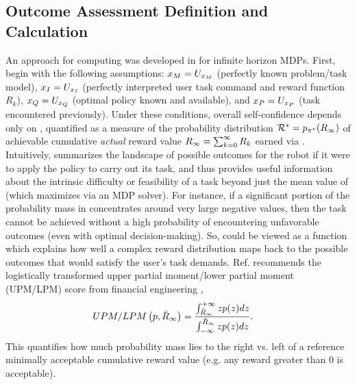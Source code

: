 \subsection{Outcome Assessment Definition and Calculation} \label{sec:xO}
An approach for computing \xO{} was developed in \cite{Aitken2016-cv} for infinite horizon MDPs. First, begin with the following assumptions: $x_M=U_{x_M}$ (perfectly known problem/task model), $x_I= U_{x_I}$ (perfectly interpreted user task command and reward function $R_k$), $x_Q=U_{x_Q}$ (optimal policy \piopt{} known and available), and $x_P=U_{x_P}$ (task encountered previously).  %
Under these conditions, overall self-confidence depends only on \xO{},  quantified as a measure of the probability distribution  $\mathcal{R}^* = p_{\pi^*}(R_{\infty})$ of achievable cumulative \emph{actual} reward value $R_{\infty}= \sum_{k=0}^{\infty}R_{k}$ earned via \piopt. %
Intuitively, \rwdopt{} summarizes the landscape of possible outcomes for the robot if it were to apply the policy \piopt{} to carry out its task, and thus provides useful information about the intrinsic difficulty or feasibility of a task beyond just the mean value of \ri{} (which \piopt{} maximizes via an MDP solver). For instance, if a significant portion of the probability mass in \rwdopt{} concentrates around very large negative values, then the task cannot be achieved without a high probability of encountering unfavorable outcomes (even with optimal decision-making). So, \xO{} could be viewed as a function which explains how well a complex reward distribution maps back to the possible outcomes that would satisfy the user's task demands. Ref. \cite{Aitken2016-cv} recommends the logistically transformed upper partial moment/lower partial moment (UPM/LPM) score from financial engineering \cite{wojt2009portfolio}, 
    \begin{align}
        \mbox{UPM/LPM} \left(p,\riref\right) &= \frac{\int_{\riref}^{+\infty}zp(z)dz}{\int_{-\infty}^{\riref} zp(z)dz}. \label{eq:upm_lpm}
    \end{align}
This quantifies how much probability mass lies to the right vs. left of a reference minimally acceptable cumulative reward value \ris{} (e.g. any reward greater than 0 is acceptable). 
